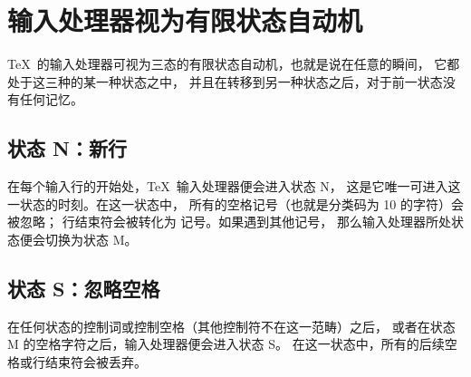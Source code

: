 \documentclass{book}
\begin{document}
\section{输入处理器视为有限状态自动机}
\label{input:states}

\TeX\ 的输入处理器可视为三态的有限状态自动机，也就是说在任意的瞬间，
它都处于这三种的某一种状态之中，
并且在转移到另一种状态之后，对于前一状态没有任何记忆。

\subsection{状态 {\italic N}：新行}

在每个输入行的开始处，\TeX\ 输入处理器便会进入状态 {\italic N}，
这是它唯一可进入这一状态的时刻。在这一状态中，
所有的空格记号（也就是分类码为 10 的字符）会被忽略；
行结束符会被转化为  记号。如果遇到其他记号，
那么输入处理器所处状态便会切换为状态 {\italic M}。

\subsection{状态 {\italic S}：忽略空格}

在任何状态的控制词或控制空格（其他控制符不在这一范畴）之后，
或者在状态 {\italic M} 的空格字符之后，输入处理器便会进入状态 {\italic S}。
在这一状态中，所有的后续空格或行结束符会被丢弃。
\end{document}
